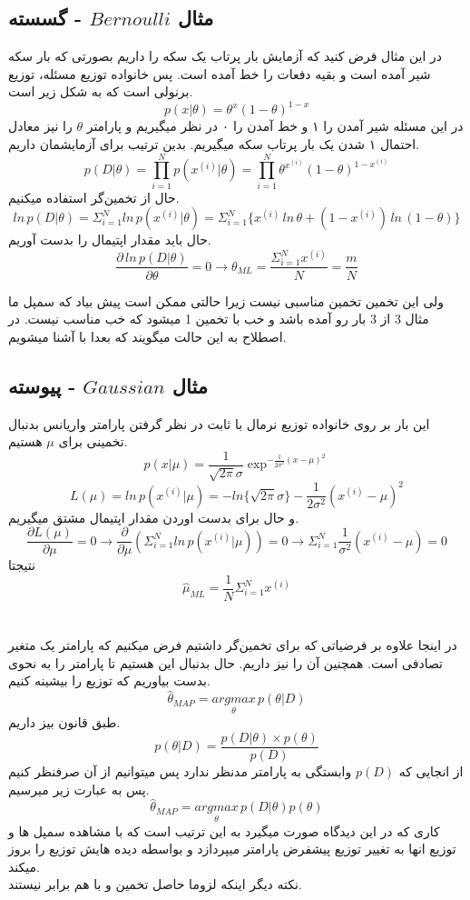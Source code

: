 \documentclass[12pt]{article}
\begin{document}
\subsection*{مثال $Bernoulli$ - گسسته}
در این مثال فرض کنید که آزمایش 
بار پرتاب یک سکه را داریم بصورتی که 
بار سکه شیر آمده است و بقیه دفعات را خط آمده است.
پس خانواده توزیع مسئله، توزیع برنولی است که به شکل زیر است.
\[p(x|\theta) = \theta^x (1 - \theta)^{1-x}\]
در این مسئله شیر آمدن را ۱ و خط آمدن را ۰ در نظر میگیریم و پارامتر 
$\theta$
را نیز معادل احتمال ۱ شدن یک بار پرتاب سکه میگیریم. 
بدین ترتیب برای آزمایشمان داریم.
\[p(D|\theta) = \prod_{i=1}^{N} p(x^{(i)}|\theta) = \prod_{i=1}^{N} \theta^{x^{(i)}} (1 - \theta)^{1 - x^{(i)}}\]
حال از تخمین‌گر استفاده میکنیم.
\[ln\,p(D|\theta) = \Sigma_{i=1}^{N}ln\,p(x^{(i)}|\theta)
    = \Sigma_{i=1}^{N} \{x^{(i)}\,ln\,\theta + (1 - x^{(i)})\,ln\,(1 - \theta)\}\]
حال باید مقدار اپتیمال را بدست آوریم.
\[\frac{\partial\, ln\,p(D|\theta)}{\partial\theta} = 0 \xrightarrow{}
    \theta_{ML} = \frac{\Sigma_{i=1}^{N} x^{(i)}}{N} = \frac{m}{N}\]

ولی این تخمین تخمین مناسبی نیست زیرا حالتی ممکن است پیش بیاد که سمپل ما مثال 3 از 3 بار رو آمده باشد و خب با تخمین 1 میشود که خب مناسب نیست. در اصطلاح به این حالت  میگویند که بعدا با آشنا میشویم.

    
\subsection{مثال $Gaussian$ - پیوسته}
این بار بر روی خانواده توزیع نرمال با ثابت در نظر گرفتن پارامتر واریانس بدنبال تخمینی برای 
$\mu$
هستیم.
\[p(x|\mu) = \frac{1}{\sqrt{2\pi}\sigma}\exp^{-\frac{1}{2\sigma^2}(x - \mu)^2}\]
\[L(\mu) = ln\,p(x^{(i)}|\mu) = -ln\{\sqrt{2\pi}\sigma\} - \frac{1}{2\sigma^2}(x^{(i)} - \mu)^2\]
و حال برای بدست اوردن مقدار اپتیمال مشتق میگیریم.
\[\frac{\partial L(\mu)}{\partial \mu} = 0 \xrightarrow[]{} \frac{\partial}{\partial\mu}(\Sigma_{i=1}^{N} ln\,p(x^{(i)}|\mu)) = 0 \xrightarrow[]{}
    \Sigma_{i=1}^{N} \frac{1}{\sigma^2}(x^{(i)} - \mu) = 0\]
نتیجتا
\[\hat{\mu}_{ML} = \frac{1}{N}\Sigma_{i=1}^{N}x^{(i)}\]

\section*{}
در اینجا علاوه بر فرضیاتی که برای تخمین‌گر 
داشتیم فرض میکنیم که پارامتر یک متغیر تصادفی است. همچنین 
آن را نیز داریم.
حال بدنبال این هستیم تا پارامتر را به نحوی بدست بیاوریم که توزیع 
را بیشینه کنیم.
\[\hat{\theta}_{MAP} = \underset{\theta}{argmax}\, p(\theta | D)\]
طبق قانون بیز داریم.
\[p(\theta|D) = \frac{p(D|\theta) \times p(\theta)}{p(D)}\]
از انجایی که 
$p(D)$
وابستگی به پارامتر مدنظر ندارد پس میتوانیم از آن صرفنظر کنیم پس به عبارت زیر میرسیم.
\[\hat{\theta}_{MAP} = \underset{\theta}{argmax}\,p(D|\theta)p(\theta)\]
کاری که در این دیدگاه صورت میگیرد به این ترتیب است که با مشاهده سمپل ها و توزیع انها به تغییر توزیع پیشفرض پارامتر میپردازد و بواسطه دیده هایش توزیع را بروز میکند.
\\
نکته دیگر اینکه لزوما حاصل تخمین 
و 
با هم برابر نیستند.
\end{document}
